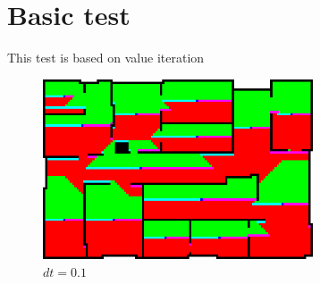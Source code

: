 \documentclass[../Head/Main.tex]{subfiles}
\begin{document}
\section{Basic test}
This test is based on value iteration
\begin{figure}[H]
    \centering
    \includegraphics[width=8cm]{../Figures/Policy2.1.32.png}
    \caption{$dt=0.1$}
    \label{fig:prob1_6_2}
\end{figure}

\end{document}
